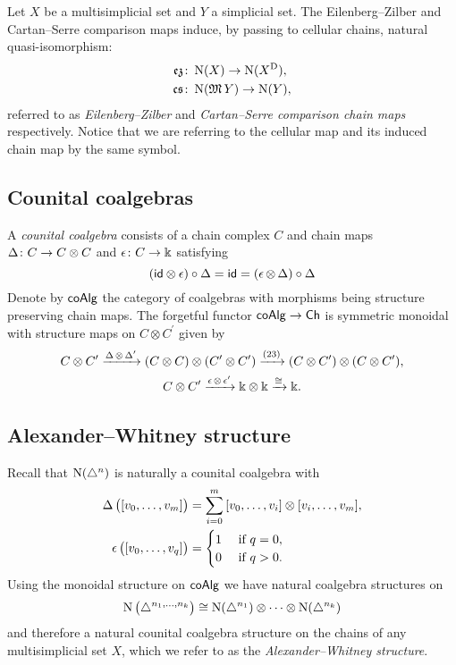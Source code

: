 Let $X$ be a multisimplicial set and $Y$ a simplicial set.
The Eilenberg--Zilber and Cartan--Serre comparison maps induce, by passing to cellular chains, natural quasi-isomorphism:
\[
\begin{split}
\operatorname{\mathfrak{ez}} &\colon \operatorname{N}(X) \to \operatorname{N}(X^{\mathrm{D}}), \\
\operatorname{\mathfrak{cs}} &\colon \operatorname{N}(\operatorname{\mathfrak{M}} Y) \to \operatorname{N}(Y), \\
\end{split}
\]
referred to as \textit{Eilenberg--Zilber} and \textit{Cartan--Serre comparison chain maps} respectively.
Notice that we are referring to the cellular map and its induced chain map by the same symbol.

\subsection{Counital coalgebras} \label{ss:coalgebras}

A \textit{counital coalgebra} consists of a chain complex $C$ and chain maps $\operatorname{\Delta} \colon C \to C \otimes C$ and $\operatorname{\epsilon} \colon C \to \Bbbk$ satisfying
\[
(\mathsf{id} \otimes \operatorname{\epsilon}) \circ \operatorname{\Delta} =
\mathsf{id} =
(\operatorname{\epsilon} \otimes \operatorname{\Delta}) \circ \operatorname{\Delta}
\]
Denote by $\mathsf{coAlg}$ the category of coalgebras with morphisms being structure preserving chain maps.
The forgetful functor $\mathsf{coAlg} \to \mathsf{Ch}$ is symmetric monoidal with structure maps on $C \otimes C^\prime$ given by
\begin{gather*}
C \otimes C^\prime \xrightarrow{\operatorname{\Delta} \otimes \operatorname{\Delta}^\prime}
(C \otimes C) \otimes (C^\prime \otimes C^\prime) \xrightarrow{(23)}
(C \otimes C^\prime) \otimes (C \otimes C^\prime), \\
C \otimes C^\prime \xrightarrow{\operatorname{\epsilon} \otimes \operatorname{\epsilon}^\prime}
\Bbbk \otimes \Bbbk \xrightarrow{\cong} \Bbbk.
\end{gather*}

\subsection{Alexander--Whitney structure} \label{ss:alexander-whitney coalgebras}

Recall that $\operatorname{N}(\triangle^n)$ is naturally a counital coalgebra with
\[
\begin{split}
\operatorname{\Delta} \big( [v_0, \dots, v_m] \big) &=
\sum_{i=0}^m \, [v_0, \dots, v_i] \otimes [v_i, \dots, v_m], \\
\operatorname{\epsilon} \big( [v_0, \dots, v_q] \big) &=
\begin{cases} 1 & \text{ if } q = 0, \\ 0 & \text{ if } q>0. \end{cases}
\end{split}
\]
Using the monoidal structure on $\mathsf{coAlg}$ we have natural coalgebra structures on
\[
\operatorname{N} \big( \triangle^{n_1, \dots, n_k} \big) \cong
\operatorname{N}(\triangle^{n_1}) \otimes \dotsb \otimes \operatorname{N}(\triangle^{n_k})
\]
and therefore a natural counital coalgebra structure on the chains of any multisimplicial set $X$, which we refer to as the \textit{Alexander--Whitney structure}.


